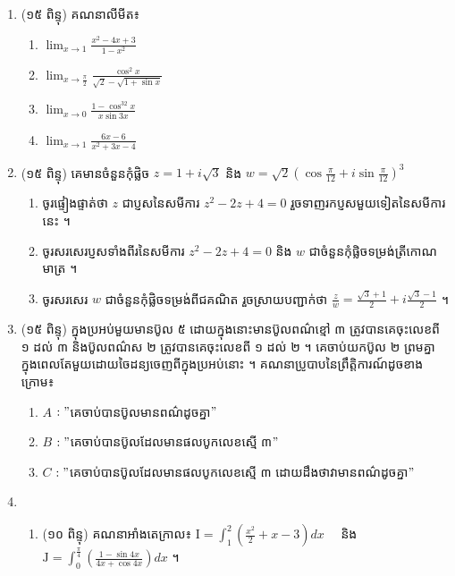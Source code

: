\documentclass{officialexam}
\begin{document}
\newpage
	{\maketitle}
	\begin{center}
	\end{center}
	\begin{enumerate}[I]
		\item {\color{khtug}(១៥ ពិន្ទុ)} គណនាលីមីត៖
		\begin{enumerate}[k,4]
			\item $\lim_{x\to1}\frac{x^2-4x+3}{1-x^2}$
			\item $\lim_{x\to\frac{\pi}{2}}\frac{\cos^2x}{\sqrt{2}-\sqrt{1+\sin x}}$
			\item $\lim_{x\to0}\frac{1-\cos^32x}{x\sin3x}$
			\item $\lim_{x\to1}\frac{6x-6}{x^2+3x-4}$
		\end{enumerate}
		\item {\color{khtug}(១៥ ពិន្ទុ)} គេមានចំនួនកុំផ្លិច $z=1+i\sqrt{3}$ និង $w=\sqrt{2}\left(\cos\frac{\pi}{12}+i\sin\frac{\pi}{12}\right)^3$
		\begin{enumerate}[k]
			\item ចូរផ្ទៀងផ្ទាត់ថា $z$ ជាប្ញសនៃសមីការ $z^2-2z+4=0$ រួចទាញរកប្ញសមួយទៀតនៃសមីការនេះ ។
			\item ចូរសរសេរប្ញសទាំងពីរនៃសមីការ $z^2-2z+4=0$ និង $w$ ជាចំនួនកុំផ្លិចទម្រង់ត្រីកោណមាត្រ ។ 
			\item ចូរសរសេរ $w$ ជាចំនួនកុំផ្លិចទម្រង់ពីជគណិត រួចស្រាយបញ្ជាក់ថា $\frac{z}{w}=\frac{\sqrt{3}+1}{2}+i\frac{\sqrt{3}-1}{2}$ ។
		\end{enumerate}
		\item {\color{khtug}(១៥ ពិន្ទុ)} ក្នុងប្រអប់មួយមានប៊ូល ៥ ដោយក្នុងនោះមានប៊ូលពណ៌ខ្មៅ ៣ ត្រូវបានគេចុះលេខពី ១ ដល់ ៣ និងប៊ូលពណ៌ស ២ ត្រូវបានគេចុះលេខពី ១ ដល់ ២ ។ គេចាប់យកប៊ូល ២ ព្រមគ្នាក្នុងពេលតែមួយដោយចៃដន្យចេញពីក្នុងប្រអប់នោះ ។ គណនាប្រូបាបនៃព្រឹត្តិការណ៍ដូចខាងក្រោម៖ 
		\begin{enumerate}[k]
			\item $A$ $ :"$គេចាប់បានប៊ូលមានពណ៌ដូចគ្នា$"$
			\item $B$ $ :"$គេចាប់បានប៊ូលដែលមានផលបូកលេខស្មើ ៣$"$ 
			\item $C$ $ :"$គេចាប់បានប៊ូលដែលមានផលបូកលេខស្មើ ៣ ដោយដឹងថាវាមានពណ៌ដូចគ្នា$"$ 
		\end{enumerate}
		\item \begin{enumerate}[1]
			\item {\color{khtug}(១០ ពិន្ទុ)} គណនាអាំងតេក្រាល៖ $\mathrm{I}=\int_{1}^{2}\left(\frac{x^2}{2}+x-3\right)dx$ ~~និង $\mathrm{J}=\int_{0}^{\frac{\pi}{4}}\left(\frac{1-\sin4x}{4x+\cos4x}\right)dx$ ។

\end{enumerate}
\end{enumerate}
\end{document}
